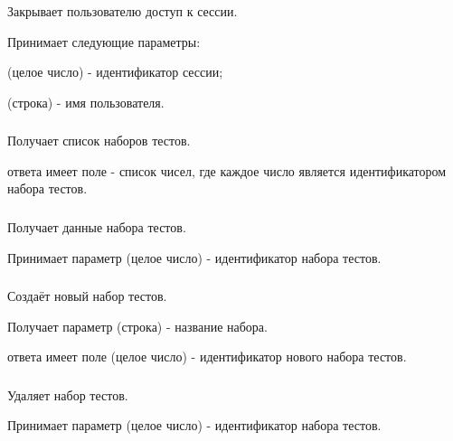 Закрывает пользователю доступ к сессии.

Принимает следующие параметры:

\begin{icItems}
	\item {} (целое число) - идентификатор сессии;
	\item {} (строка) - имя пользователя.
\end{icItems}

\subsubsection{}

Получает список наборов тестов.

 ответа имеет поле  - список чисел, где каждое число является идентификатором набора тестов.

\subsubsection{}

Получает данные набора тестов. 

Принимает параметр  (целое число) - идентификатор набора тестов.

\subsubsection{}

Создаёт новый набор тестов.

Получает параметр  (строка) - название набора.

 ответа имеет поле  (целое число) - идентификатор нового набора тестов.

\subsubsection{}

Удаляет набор тестов.

Принимает параметр  (целое число) - идентификатор набора тестов.

\subsubsection{}

